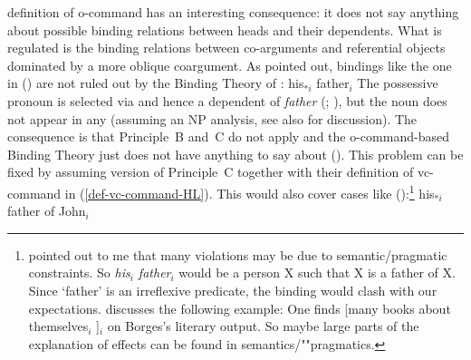 \documentclass[output=paper,biblatex,babelshorthands,newtxmath,draftmode,colorlinks,citecolor=brown]{langscibook}
\begin{document}
 definition of o-command has an interesting consequence: it does not say anything about possible
binding relations between heads and their dependents. What is regulated is the binding relations
between co-arguments and referential objects dominated by a more oblique coargument. As
\citet[]{Mueller99a} pointed out, bindings like the one in () are not ruled out by
the Binding Theory of \citet[Chapter~6]{ps2}: 
\ea
his$_{*i}$ father$_i$
\z
The possessive pronoun is selected via \spr and hence a dependent of \emph{father}
(\citealt{MuellerHeadless,MyPM2021a}; \crossrefchapteralt[\page \pageref{knjiga-avm}]{agreement}), but the noun does not appear in any \argstl (assuming an NP
analysis, see also  for discussion). The consequence is that Principle~B and~C do not apply and the o-command-based Binding Theory just
does not have anything to say about (). This problem can be fixed by assuming 
version of Principle~C together with their definition of vc-command in (\ref{def-vc-command-HL}).
This would also cover cases like ():\footnote{%
\gisu pointed out to me that many \iwithini violations may be due to semantic/pragmatic
  constraints. So \emph{his$_i$ father$_i$} would be a person X such that X is a father of X. Since
  `father' is an irreflexive predicate, the binding would clash with our expectations. \citet[]{Culicover1997a-u} discusses the following example:
\ea
One finds [many books about themselves$_{i}$ ]$_{i}$  on Borges’s literary output.
\z
So maybe large parts of the explanation of \iwithini effects can be found in semantics/""pragmatics.
}
\ea
his$_{*i}$ father of John$_i$
\z
\end{document}
